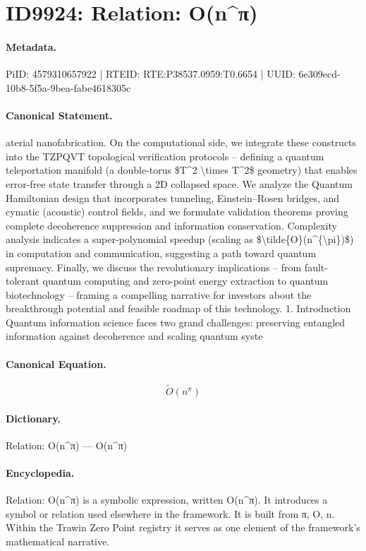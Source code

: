\section*{ID9924: Relation: O(n\textasciicircum{}π)}
\paragraph{Metadata.}
PiID: 4579310657922 | RTEID: RTE:P38537.0959:T0.6654 | UUID: 6e309ecd-10b8-5f5a-9bea-fabe4618305c

\paragraph{Canonical Statement.}
aterial nanofabrication. On the computational side, we integrate these constructs into the TZPQVT topological verification protocols – defining a quantum teleportation manifold (a double-torus \$T\textasciicircum{}2 \textbackslash{}times T\textasciicircum{}2\$ geometry) that enables error-free state transfer through a 2D collapsed space. We analyze the Quantum Hamiltonian design that incorporates tunneling, Einstein–Rosen bridges, and cymatic (acoustic) control fields, and we formulate validation theorems proving complete decoherence suppression and information conservation. Complexity analysis indicates a super-polynomial speedup (scaling as \$\textbackslash{}tilde\{O\}(n\textasciicircum{}\{\textbackslash{}pi\})\$) in computation and communication, suggesting a path toward quantum supremacy. Finally, we discuss the revolutionary implications – from fault-tolerant quantum computing and zero-point energy extraction to quantum biotechnology – framing a compelling narrative for investors about the breakthrough potential and feasible roadmap of this technology. 1. Introduction Quantum information science faces two grand challenges: preserving entangled information against decoherence and scaling quantum syste

\paragraph{Canonical Equation.}
\[
\tilde{O}(n^{\pi})
\]

\paragraph{Dictionary.}
Relation: O(n\textasciicircum{}π) — O(n\textasciicircum{}π)

\paragraph{Encyclopedia.}
Relation: O(n\textasciicircum{}π) is a symbolic expression, written O(n\textasciicircum{}π). It introduces a symbol or relation used elsewhere in the framework. It is built from π, O, n. Within the Trawin Zero Point registry it serves as one element of the framework's mathematical narrative.
